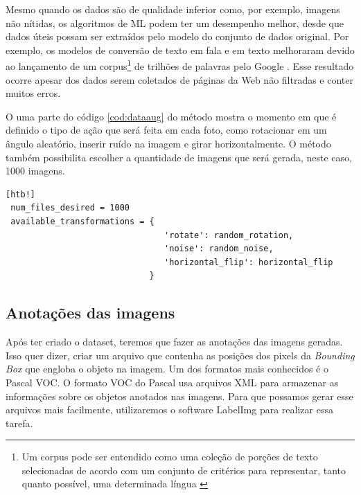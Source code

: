 Mesmo quando os dados são de qualidade inferior como, por exemplo, imagens não nítidas, os algoritmos de ML podem ter um desempenho melhor, desde que dados úteis possam ser extraídos pelo modelo do conjunto de dados original. Por exemplo, os modelos de conversão de texto em fala e em texto melhoraram devido ao lançamento de um corpus\footnote{Um corpus pode ser entendido como uma coleção de porções de texto selecionadas de acordo com um conjunto de critérios para representar, tanto quanto possível, uma determinada língua \cite{sinclair2005corpus}} de trilhões de palavras pelo Google \cite{halevy2009unreasonable}. Esse resultado ocorre apesar dos dados serem coletados de páginas da Web não filtradas e conter muitos erros.\cite{dataAug}

O uma parte do código \ref{cod:dataaug} do método mostra o momento em que é definido o tipo de ação que será feita em cada foto, como rotacionar em um ângulo aleatório, inserir ruído na imagem e girar horizontalmente. O método também possibilita escolher a quantidade de imagens que será gerada, neste caso, 1000 imagens.

\begin{lstlisting}[caption=Exemplo de código do método \textit{data augmentation}, label=cod:dataaug][htb!]
 num_files_desired = 1000
 available_transformations = {
                                'rotate': random_rotation,
                                'noise': random_noise,
                                'horizontal_flip': horizontal_flip
                             }
\end{lstlisting}


\subsection{Anotações das imagens}

Após ter criado o dataset, teremos que fazer as anotações das imagens geradas. Isso quer dizer, criar um arquivo que contenha as posições dos pixels da \textit{Bounding Box} que engloba o objeto na imagem. Um dos formatos mais conhecidos é o Pascal VOC. O formato VOC do Pascal usa arquivos XML para armazenar as informações sobre os objetos anotados nas imagens. Para que possamos gerar esse arquivos mais facilmente, utilizaremos o software LabelImg para realizar essa tarefa.


